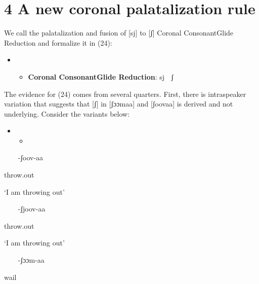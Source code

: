 \documentclass[output=paper]{langsci/langscibook}
\begin{document}
\chapter{4 A new coronal palatalization rule}

We call the palatalization and fusion of [sj] to [ʃ] Coronal ConsonantGlide Reduction and formalize it in (24):

\setcounter{itemize}{0}
\begin{itemize}
\item \setcounter{itemize}{0}
\begin{itemize}
\item \textbf{Coronal ConsonantGlide Reduction}: sj  ʃ

\end{itemize}
\end{itemize}

The evidence for (24) comes from several quarters. First, there is intraspeaker variation that suggests that [ʃ] in [ʃɔɔmaa] and [ʃoovaa] is derived and not underlying. Consider the variants below:

\begin{itemize}
\item \setcounter{itemize}{0}
\begin{itemize}
\item \end{itemize}
\end{itemize}
\setcounter{itemize}{0}
\begin{itemize}
\item [-ʃoov-aa]

\end{itemize}

throw.out

‘I am throwing out’

\begin{itemize}
\item [-ʃjoov-aa]

\end{itemize}

throw.out

‘I am throwing out’

\begin{itemize}
\item [-ʃɔɔm-aa]

\end{itemize}

wail
\end{document}
